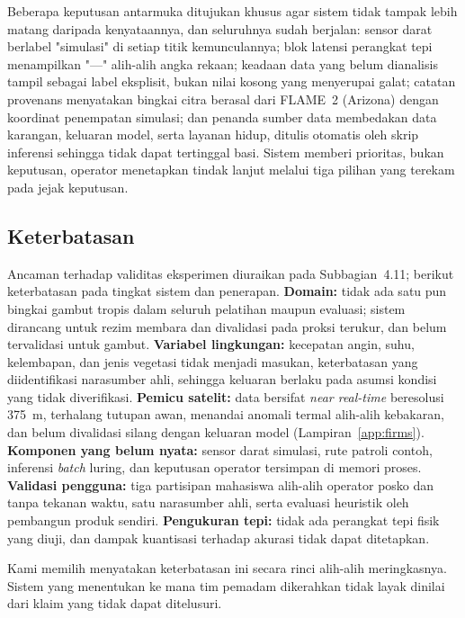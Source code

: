 Beberapa keputusan antarmuka ditujukan khusus agar sistem tidak tampak lebih
matang daripada kenyataannya, dan seluruhnya sudah berjalan: sensor darat
berlabel "simulasi" di setiap titik kemunculannya; blok latensi perangkat tepi
menampilkan "---" alih-alih angka rekaan; keadaan data yang belum dianalisis
tampil sebagai label eksplisit, bukan nilai kosong yang menyerupai galat;
catatan provenans menyatakan bingkai citra berasal dari FLAME~2 (Arizona) dengan
koordinat penempatan simulasi; dan penanda sumber data membedakan data karangan,
keluaran model, serta layanan hidup, ditulis otomatis oleh skrip inferensi
sehingga tidak dapat tertinggal basi. Sistem memberi prioritas, bukan
keputusan, operator menetapkan tindak lanjut melalui tiga pilihan yang terekam
pada jejak keputusan.

\subsection{Keterbatasan}

Ancaman terhadap validitas eksperimen diuraikan pada Subbagian~4.11; berikut
keterbatasan pada tingkat sistem dan penerapan. \textbf{Domain:} tidak ada satu
pun bingkai gambut tropis dalam seluruh pelatihan maupun evaluasi; sistem
dirancang untuk rezim membara dan divalidasi pada proksi terukur, dan belum
tervalidasi untuk gambut. \textbf{Variabel lingkungan:} kecepatan angin, suhu,
kelembapan, dan jenis vegetasi tidak menjadi masukan, keterbatasan yang
diidentifikasi narasumber ahli, sehingga keluaran berlaku pada asumsi kondisi
yang tidak diverifikasi. \textbf{Pemicu satelit:} data bersifat \emph{near
real-time} beresolusi 375~m, terhalang tutupan awan, menandai anomali termal
alih-alih kebakaran, dan belum divalidasi silang dengan keluaran model
(Lampiran~\ref{app:firms}). \textbf{Komponen yang belum nyata:} sensor darat
simulasi, rute patroli contoh, inferensi \emph{batch} luring, dan keputusan
operator tersimpan di memori proses. \textbf{Validasi pengguna:} tiga partisipan
mahasiswa alih-alih operator posko dan tanpa tekanan waktu, satu narasumber
ahli, serta evaluasi heuristik oleh pembangun produk sendiri. \textbf{Pengukuran
tepi:} tidak ada perangkat tepi fisik yang diuji, dan dampak kuantisasi terhadap
akurasi tidak dapat ditetapkan.

Kami memilih menyatakan keterbatasan ini secara rinci alih-alih meringkasnya.
Sistem yang menentukan ke mana tim pemadam dikerahkan tidak layak dinilai dari
klaim yang tidak dapat ditelusuri.
